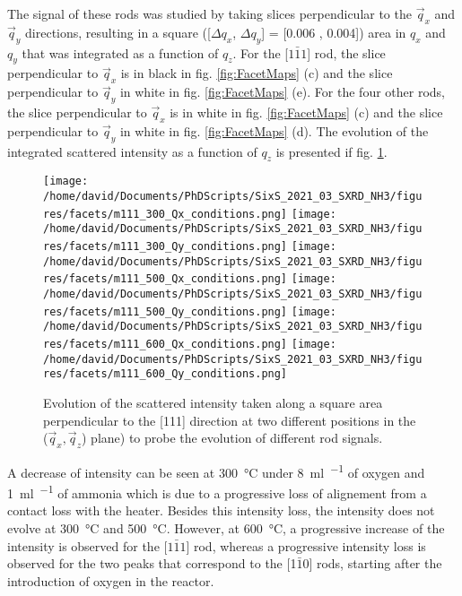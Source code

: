 The signal of these rods was studied by taking slices perpendicular to the $\vec{q}_x$ and $\vec{q}_y$ directions, resulting in a square ([$\Delta q_x$, $\Delta q_y$] = [0.006 , 0.004]) area in $q_x$ and $q_y$ that was integrated as a function of $q_z$.
For the [$1\bar{1}1$] rod, the slice perpendicular to $\vec{q}_x$ is in black in fig. \ref{fig:FacetMaps} (c) and the slice perpendicular to $\vec{q}_y$ in white in fig. \ref{fig:FacetMaps} (e).
For the four other rods, the slice perpendicular to $\vec{q}_x$ is in white in fig. \ref{fig:FacetMaps} (c) and the slice perpendicular to $\vec{q}_y$ in white in fig. \ref{fig:FacetMaps} (d).
The evolution of the integrated scattered intensity as a function of $q_z$ is presented if fig. \ref{fig:FacetSignal}.

\begin{figure}[!htb]
    \centering
    \texttt{[image: /home/david/Documents/PhDScripts/SixS\_2021\_03\_SXRD\_NH3/figures/facets/m111\_300\_Qx\_conditions.png]}
    \texttt{[image: /home/david/Documents/PhDScripts/SixS\_2021\_03\_SXRD\_NH3/figures/facets/m111\_300\_Qy\_conditions.png]}
    \texttt{[image: /home/david/Documents/PhDScripts/SixS\_2021\_03\_SXRD\_NH3/figures/facets/m111\_500\_Qx\_conditions.png]}
    \texttt{[image: /home/david/Documents/PhDScripts/SixS\_2021\_03\_SXRD\_NH3/figures/facets/m111\_500\_Qy\_conditions.png]}
    \texttt{[image: /home/david/Documents/PhDScripts/SixS\_2021\_03\_SXRD\_NH3/figures/facets/m111\_600\_Qx\_conditions.png]}
    \texttt{[image: /home/david/Documents/PhDScripts/SixS\_2021\_03\_SXRD\_NH3/figures/facets/m111\_600\_Qy\_conditions.png]}
    \caption{
    Evolution of the scattered intensity taken along a square area perpendicular to the [111] direction at two different positions in the ($\vec{q}_x, \vec{q}_z$) plane) to probe the evolution of different rod signals.
    }
    \label{fig:FacetSignal}
\end{figure}

A decrease of intensity can be seen at \qty{300}{\degreeCelsius} under \qty{8}{\ml\per\min} of oxygen and \qty{1}{\ml\per\min} of ammonia which is due to a progressive loss of alignement from a contact loss with the heater.
Besides this intensity loss, the intensity does not evolve at \qty{300}{\degreeCelsius} and \qty{500}{\degreeCelsius}.
However, at \qty{600}{\degreeCelsius}, a progressive increase of the intensity is observed for the [$1\bar{1}1$] rod, whereas a progressive intensity loss is observed for the two peaks that correspond to the [1$\bar{1}0$] rods, starting after the introduction of oxygen in the reactor.

